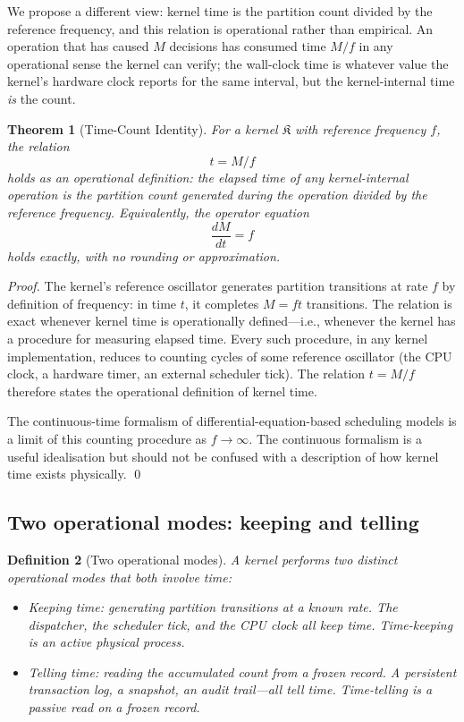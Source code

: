 \documentclass[twocolumn,11pt,a4paper]{article}
\newtheorem{theorem}{Theorem}[section]
\newtheorem{definition}[theorem]{Definition}
\newcommand{\Kernel}{\mathfrak{K}}
\newcommand{\Mcount}{M}
\begin{document}
We propose a different view: kernel time is the partition count divided by the reference frequency, and this relation is operational rather than empirical. An operation that has caused $\Mcount$ decisions has consumed time $\Mcount/f$ in any operational sense the kernel can verify; the wall-clock time is whatever value the kernel's hardware clock reports for the same interval, but the kernel-internal time \emph{is} the count.

\begin{theorem}[Time-Count Identity]
\label{thm:time-count}
For a kernel $\Kernel$ with reference frequency $f$, the relation
\[
t = \Mcount / f
\]
holds as an operational definition: the elapsed time of any kernel-internal operation \emph{is} the partition count generated during the operation divided by the reference frequency. Equivalently, the operator equation
\[
\frac{d\Mcount}{dt} = f
\]
holds exactly, with no rounding or approximation.
\end{theorem}

\begin{proof}
The kernel's reference oscillator generates partition transitions at rate $f$ by definition of frequency: in time $t$, it completes $\Mcount = ft$ transitions. The relation is exact whenever kernel time is operationally defined---i.e., whenever the kernel has a procedure for measuring elapsed time. Every such procedure, in any kernel implementation, reduces to counting cycles of some reference oscillator (the CPU clock, a hardware timer, an external scheduler tick). The relation $t = \Mcount/f$ therefore states the operational definition of kernel time.

The continuous-time formalism of differential-equation-based scheduling models is a limit of this counting procedure as $f \to \infty$. The continuous formalism is a useful idealisation but should not be confused with a description of how kernel time exists physically. \qed
\end{proof}

\subsection{Two operational modes: keeping and telling}

\begin{definition}[Two operational modes]
\label{def:two-modes}
A kernel performs two distinct operational modes that both involve time:
\begin{itemize}[nosep, leftmargin=*]
\item \emph{Keeping time}: generating partition transitions at a known rate. The dispatcher, the scheduler tick, and the CPU clock all keep time. Time-keeping is an active physical process.
\item \emph{Telling time}: reading the accumulated count from a frozen record. A persistent transaction log, a snapshot, an audit trail---all tell time. Time-telling is a passive read on a frozen record.
\end{itemize}
\end{definition}
\end{document}
